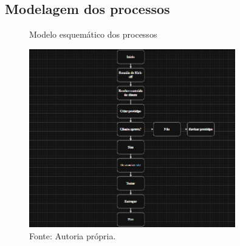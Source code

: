 \subsection{Modelagem dos processos}

\begin{figure} [h!]	
    \centering

    \caption{Modelo esquemático dos processos}
    \includegraphics[width=0.8\textwidth]{Figures/modelo_esquematico_dos_processos.png}
    \caption*{Fonte: Autoria própria.}
    \label{fig:modelagem_dos_processos}
\end{figure}
